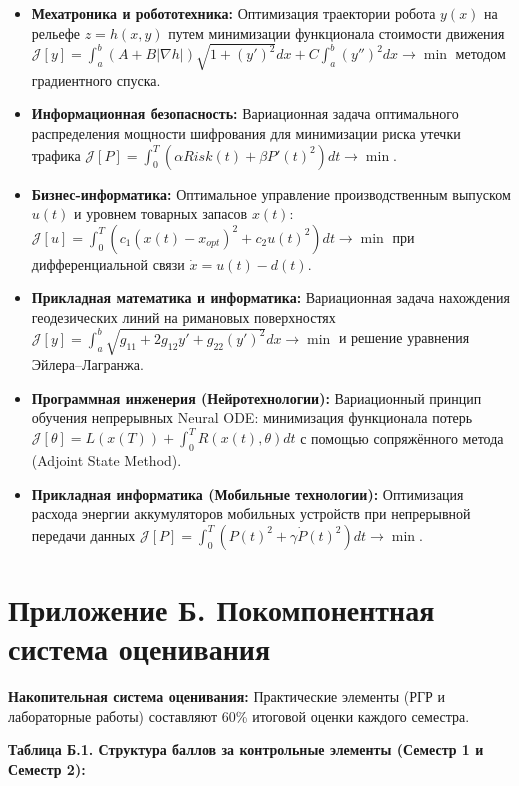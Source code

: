\documentclass[12pt]{article}
\begin{document}
\begin{itemize}[nosep]
    \item \textbf{Мехатроника и робототехника:} Оптимизация траектории робота $y(x)$ на рельефе $z = h(x, y)$ путем минимизации функционала стоимости движения $\mathcal{J}[y] = \int_{a}^{b} (A + B |\nabla h|) \sqrt{1 + (y')^2} dx + C \int_{a}^{b} (y'')^2 dx \to \min$ методом градиентного спуска.
    \item \textbf{Информационная безопасность:} Вариационная задача оптимального распределения мощности шифрования для минимизации риска утечки трафика $\mathcal{J}[P] = \int_0^T (\alpha Risk(t) + \beta P'(t)^2) dt \to \min$.
    \item \textbf{Бизнес-информатика:} Оптимальное управление производственным выпуском $u(t)$ и уровнем товарных запасов $x(t)$: $\mathcal{J}[u] = \int_0^T \left( c_1 (x(t) - x_{opt})^2 + c_2 u(t)^2 \right) dt \to \min$ при дифференциальной связи $\dot{x} = u(t) - d(t)$.
    \item \textbf{Прикладная математика и информатика:} Вариационная задача нахождения геодезических линий на римановых поверхностях $\mathcal{J}[y] = \int_a^b \sqrt{g_{11} + 2g_{12}y' + g_{22}(y')^2} dx \to \min$ и решение уравнения Эйлера--Лагранжа.
    \item \textbf{Программная инженерия (Нейротехнологии):} Вариационный принцип обучения непрерывных Neural ODE: минимизация функционала потерь $\mathcal{J}[\theta] = L(x(T)) + \int_0^T R(x(t), \theta) dt$ с помощью сопряжённого метода (Adjoint State Method).
    \item \textbf{Прикладная информатика (Мобильные технологии):} Оптимизация расхода энергии аккумуляторов мобильных устройств при непрерывной передачи данных $\mathcal{J}[P] = \int_0^T (P(t)^2 + \gamma \dot{P}(t)^2) dt \to \min$.
\end{itemize}

\newpage

\section*{Приложение Б. Покомпонентная система оценивания}\label{app:B}

\begin{greenblock}
\textbf{Накопительная система оценивания:} Практические элементы (РГР и лабораторные работы) составляют 60\% итоговой оценки каждого семестра.
\end{greenblock}

\vspace{0.5em}
\noindent\textbf{Таблица Б.1. Структура баллов за контрольные элементы (Семестр 1 и Семестр 2):}
\end{document}
